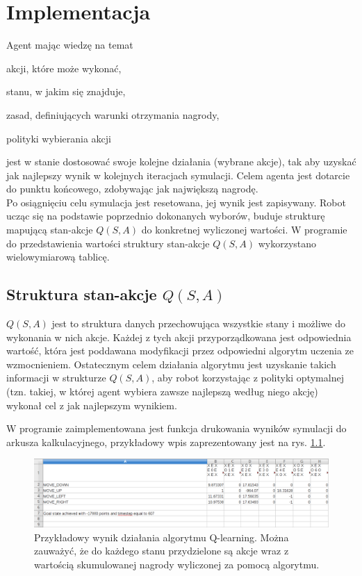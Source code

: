 \chapter{Implementacja}
\label{cha:implementacja}

Agent mając wiedzę na temat
\begin{itemize*}
\renewcommand{\labelitemi}{$\bullet$}
 \item akcji, które może wykonać,
 \item stanu, w jakim się znajduje,
 \item zasad, definiujących warunki otrzymania nagrody,
 \item polityki wybierania akcji
\end{itemize*}
jest w stanie dostosować swoje kolejne działania (wybrane akcje), tak aby uzyskać jak
najlepszy wynik w kolejnych iteracjach symulacji. Celem agenta jest dotarcie do punktu końcowego, zdobywając jak 
największą nagrodę. \\
\indent Po osiągnięciu celu symulacja jest resetowana, jej wynik jest zapisywany. Robot ucząc się na podstawie 
poprzednio dokonanych wyborów, buduje strukturę mapującą stan-akcje $Q(S, A)$ do konkretnej wyliczonej wartości. W 
programie do przedstawienia wartości struktury stan-akcje $Q(S, A)$ wykorzystano wielowymiarową tablicę.

\section{Struktura stan-akcje $Q(S, A)$}

$Q(S, A)$ jest to struktura danych przechowująca wszystkie stany i możliwe do wykonania w nich akcje. Każdej z tych 
akcji przyporządkowana jest odpowiednia wartość, która jest poddawana modyfikacji przez odpowiedni algorytm uczenia ze 
wzmocnieniem.
Ostatecznym celem działania algorytmu jest uzyskanie takich informacji w strukturze $Q(S, A)$, aby robot korzystając z polityki optymalnej (tzn. takiej, w której agent wybiera zawsze najlepszą według niego akcję) wykonał cel z jak najlepszym wynikiem.

W programie zaimplementowana jest funkcja drukowania wyników symulacji do arkusza kalkulacyjnego, przykładowy wpis 
zaprezentowany jest na rys. \ref{fig:przykladowywpis}.


\begin{figure}[H]
    \centering
    \includegraphics[scale=0.4]{przykladowywpis}
    \caption{Przykładowy wynik działania algorytmu Q-learning. Można zauważyć, że do każdego stanu przydzielone są 
akcje wraz z wartością skumulowanej nagrody wyliczonej za pomocą algorytmu.}
    \label{fig:przykladowywpis}
\end{figure}

